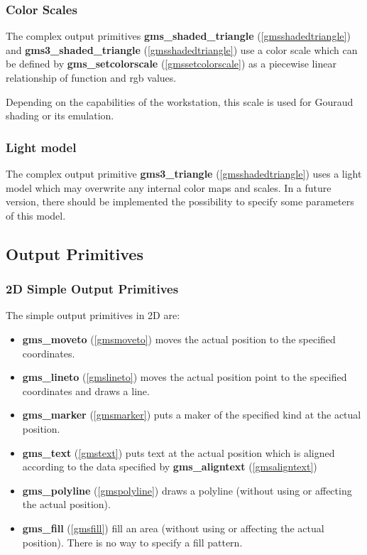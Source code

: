 \subsubsection{Color Scales\label{defcolorsc}} 
The complex output primitives 
{\bf gms\_shaded\_triangle} (\ref{gmsshadedtriangle}) and
{\bf gms3\_shaded\_triangle} (\ref{gmsshadedtriangle})
use a color scale which can 
be defined by 
{\bf gms\_setcolorscale} (\ref{gmssetcolorscale}) as
a piecewise linear relationship of function and rgb values.

Depending on the capabilities of the workstation, this 
scale is used for Gouraud shading or its emulation.




\subsubsection{Light model\label{lightmod}} 
The complex output primitive
{\bf gms3\_triangle} (\ref{gmsshadedtriangle})
uses a light model which may overwrite any internal
color maps and scales.
In a future version, there should be implemented
the possibility to specify some parameters of this model.




\subsection{Output Primitives\label{Outprim}}

\subsubsection{2D Simple Output Primitives\label{2Dsimp}}The simple output primitives in 2D are:
\begin{itemize}
\item 
{\bf gms\_moveto} (\ref{gmsmoveto})
moves the actual position  to the specified coordinates.
\item 
{\bf gms\_lineto} (\ref{gmslineto})
moves the actual position point to the specified coordinates
and draws a line.
\item 
{\bf gms\_marker} (\ref{gmsmarker})
puts a maker of the specified kind
at the 
actual position.
\item 
{\bf gms\_text} (\ref{gmstext})
puts text at the actual position which is aligned
according to the data specified by
{\bf gms\_aligntext} (\ref{gmsaligntext})
\item 
{\bf gms\_polyline} (\ref{gmspolyline})
draws a polyline (without using or affecting the actual position).
\item 
{\bf gms\_fill} (\ref{gmsfill})
fill an area (without using or affecting the actual position).
There is no way to specify a fill pattern.
\end{itemize}

